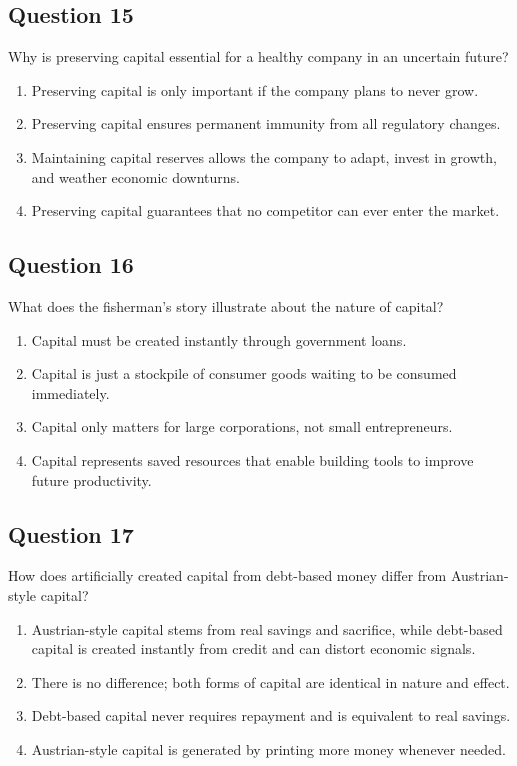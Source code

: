 \documentclass[12pt,a4paper]{article}
\begin{document}
\bigskip


\subsection*{Question 15}
Why is preserving capital essential for a healthy company in an uncertain future?

\begin{enumerate}[label=\Alph*., leftmargin=*]
\item Preserving capital is only important if the company plans to never grow.
\item Preserving capital ensures permanent immunity from all regulatory changes.
\item Maintaining capital reserves allows the company to adapt, invest in growth, and weather economic downturns.
\item Preserving capital guarantees that no competitor can ever enter the market.
\end{enumerate}

\bigskip


\subsection*{Question 16}
What does the fisherman’s story illustrate about the nature of capital?

\begin{enumerate}[label=\Alph*., leftmargin=*]
\item Capital must be created instantly through government loans.
\item Capital is just a stockpile of consumer goods waiting to be consumed immediately.
\item Capital only matters for large corporations, not small entrepreneurs.
\item Capital represents saved resources that enable building tools to improve future productivity.
\end{enumerate}

\bigskip


\subsection*{Question 17}
How does artificially created capital from debt-based money differ from Austrian-style capital?

\begin{enumerate}[label=\Alph*., leftmargin=*]
\item Austrian-style capital stems from real savings and sacrifice, while debt-based capital is created instantly from credit and can distort economic signals.
\item There is no difference; both forms of capital are identical in nature and effect.
\item Debt-based capital never requires repayment and is equivalent to real savings.
\item Austrian-style capital is generated by printing more money whenever needed.
\end{enumerate}
\end{document}
